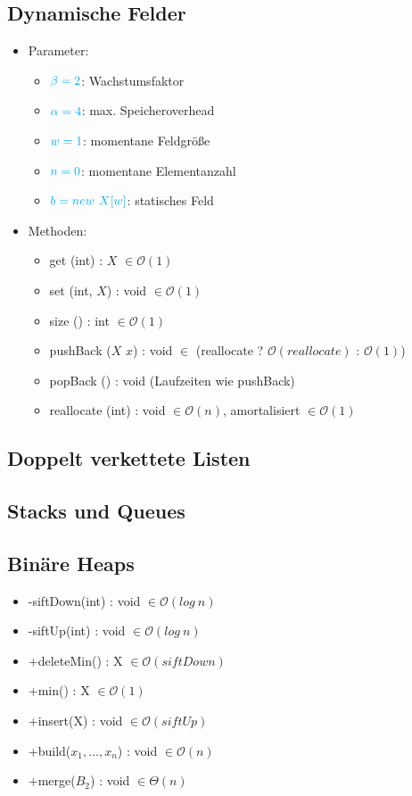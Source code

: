 \documentclass[12pt,a4paper]{article}
\begin{document}
\subsection{Dynamische Felder}
\begin{itemize}
\item Parameter:\begin{itemize}
\item $\color{cyan}\beta =2$: Wachstumsfaktor
\item $\color{cyan}\alpha =4$: max. Speicheroverhead
\item $\color{cyan}w=1$: momentane Feldgröße
\item $\color{cyan}n=0$: momentane Elementanzahl
\item $\color{cyan}b=new ~X[w]$: statisches Feld
\end{itemize}
\item Methoden:\begin{itemize}
\item get (int) : $X$ $\in\mathcal{O}(1)$
\item set (int, $X$) : void $\in\mathcal{O}(1)$
\item size () : int $\in\mathcal{O}(1)$
\item pushBack ($X$ $x$) : void $\in$ (reallocate ? $\mathcal{O}(reallocate)$ : $\mathcal{O}(1)$)
\item popBack () : void (Laufzeiten wie pushBack)
\item reallocate (int) : void $\in\mathcal{O}(n)$, amortalisiert $\in\mathcal{O}(1)$
\end{itemize}
\end{itemize}
\subsection{Doppelt verkettete Listen}

\subsection{Stacks und Queues}

\subsection{Binäre Heaps}
\begin{itemize}
\item -siftDown(int) : void $\in\mathcal{O}(log~n)$
\item -siftUp(int) : void $\in\mathcal{O}(log~n)$
\item +deleteMin() : X $\in\mathcal{O}(siftDown)$
\item +min() : X $\in\mathcal{O}(1)$
\item +insert(X) : void $\in\mathcal{O}(siftUp)$
\item +build($x_1,...,x_n$) : void $\in\mathcal{O}(n)$
\item +merge($B_2$) : void $\in\Theta(n)$
\end{itemize}
\end{document}
